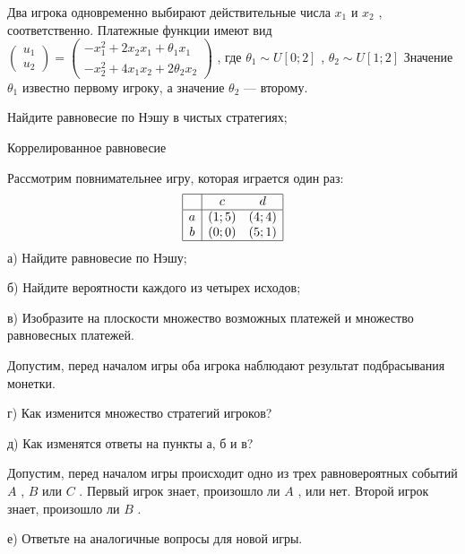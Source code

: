 \begin{problem}

Два игрока одновременно выбирают действительные числа  $x_{1} $  и  $x_{2} $ , соответственно.
Платежные функции имеют вид\\
 $\left(\begin{array}{l} {u_{1} } \\ {u_{2} } \end{array}\right)=\left(\begin{array}{l} {-x_{1}^{2} +2x_{2} x_{1} +\theta _{1} x_{1} } \\ {-x_{2}^{2} +4x_{1} x_{2} +2\theta _{2} x_{2} } \end{array}\right)$ , где  $\theta _{1} \sim U\left[0;2\right]$ ,  $\theta _{2} \sim U\left[1;2\right]$
Значение  $\theta _{1} $  известно первому игроку, а значение  $\theta _{2} $  — второму.

Найдите равновесие по Нэшу в чистых стратегиях;



\begin{sol}

\end{sol}
\end{problem}



\begin{problem}
 Коррелированное равновесие

Рассмотрим повнимательнее игру, которая играется один раз:
\[\begin{array}{|c|cc|}  \hline {} & {c} & {d} \\  \hline {a} & {\left(1;5\right)} & {\left(4;4\right)} \\ {b} & {\left(0;0\right)} & {\left(5;1\right)} \\  \hline  \end{array}\]
а) Найдите равновесие по Нэшу;\par
б) Найдите вероятности каждого из четырех исходов;\par
в) Изобразите на плоскости множество возможных платежей и множество равновесных платежей.\par
Допустим, перед началом игры оба игрока наблюдают результат подбрасывания монетки.\par
г) Как изменится множество стратегий игроков?\par
д) Как изменятся ответы на пункты а, б и в?\par
Допустим, перед началом игры происходит одно из трех равновероятных событий  $A$ ,  $B$  или  $C$ . Первый игрок знает, произошло ли  $A$ , или нет. Второй игрок знает, произошло ли  $B$ .\par
е) Ответьте на аналогичные вопросы для новой игры.\par



\begin{sol}

\end{sol}
\end{problem}



